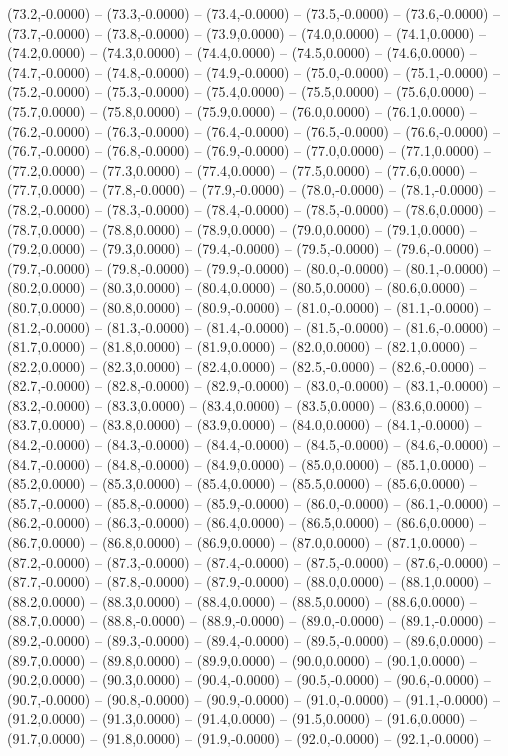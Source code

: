 \documentclass{SVnote}
\begin{document}
(73.2,-0.0000) -- (73.3,-0.0000) -- (73.4,-0.0000) -- (73.5,-0.0000) -- (73.6,-0.0000) -- (73.7,-0.0000) -- (73.8,-0.0000) -- (73.9,0.0000) -- (74.0,0.0000) -- (74.1,0.0000) -- (74.2,0.0000) -- (74.3,0.0000) -- (74.4,0.0000) -- (74.5,0.0000) -- (74.6,0.0000) -- (74.7,-0.0000) -- (74.8,-0.0000) -- (74.9,-0.0000) -- (75.0,-0.0000) -- (75.1,-0.0000) -- (75.2,-0.0000) -- (75.3,-0.0000) -- (75.4,0.0000) -- (75.5,0.0000) -- (75.6,0.0000) -- (75.7,0.0000) -- (75.8,0.0000) -- (75.9,0.0000) -- (76.0,0.0000) -- (76.1,0.0000) -- (76.2,-0.0000) -- (76.3,-0.0000) -- (76.4,-0.0000) -- (76.5,-0.0000) -- (76.6,-0.0000) -- (76.7,-0.0000) -- (76.8,-0.0000) -- (76.9,-0.0000) -- (77.0,0.0000) -- (77.1,0.0000) -- (77.2,0.0000) -- (77.3,0.0000) -- (77.4,0.0000) -- (77.5,0.0000) -- (77.6,0.0000) -- (77.7,0.0000) -- (77.8,-0.0000) -- (77.9,-0.0000) -- (78.0,-0.0000) -- (78.1,-0.0000) -- (78.2,-0.0000) -- (78.3,-0.0000) -- (78.4,-0.0000) -- (78.5,-0.0000) -- (78.6,0.0000) -- (78.7,0.0000) -- (78.8,0.0000) -- (78.9,0.0000) -- (79.0,0.0000) -- (79.1,0.0000) -- (79.2,0.0000) -- (79.3,0.0000) -- (79.4,-0.0000) -- (79.5,-0.0000) -- (79.6,-0.0000) -- (79.7,-0.0000) -- (79.8,-0.0000) -- (79.9,-0.0000) -- (80.0,-0.0000) -- (80.1,-0.0000) -- (80.2,0.0000) -- (80.3,0.0000) -- (80.4,0.0000) -- (80.5,0.0000) -- (80.6,0.0000) -- (80.7,0.0000) -- (80.8,0.0000) -- (80.9,-0.0000) -- (81.0,-0.0000) -- (81.1,-0.0000) -- (81.2,-0.0000) -- (81.3,-0.0000) -- (81.4,-0.0000) -- (81.5,-0.0000) -- (81.6,-0.0000) -- (81.7,0.0000) -- (81.8,0.0000) -- (81.9,0.0000) -- (82.0,0.0000) -- (82.1,0.0000) -- (82.2,0.0000) -- (82.3,0.0000) -- (82.4,0.0000) -- (82.5,-0.0000) -- (82.6,-0.0000) -- (82.7,-0.0000) -- (82.8,-0.0000) -- (82.9,-0.0000) -- (83.0,-0.0000) -- (83.1,-0.0000) -- (83.2,-0.0000) -- (83.3,0.0000) -- (83.4,0.0000) -- (83.5,0.0000) -- (83.6,0.0000) -- (83.7,0.0000) -- (83.8,0.0000) -- (83.9,0.0000) -- (84.0,0.0000) -- (84.1,-0.0000) -- (84.2,-0.0000) -- (84.3,-0.0000) -- (84.4,-0.0000) -- (84.5,-0.0000) -- (84.6,-0.0000) -- (84.7,-0.0000) -- (84.8,-0.0000) -- (84.9,0.0000) -- (85.0,0.0000) -- (85.1,0.0000) -- (85.2,0.0000) -- (85.3,0.0000) -- (85.4,0.0000) -- (85.5,0.0000) -- (85.6,0.0000) -- (85.7,-0.0000) -- (85.8,-0.0000) -- (85.9,-0.0000) -- (86.0,-0.0000) -- (86.1,-0.0000) -- (86.2,-0.0000) -- (86.3,-0.0000) -- (86.4,0.0000) -- (86.5,0.0000) -- (86.6,0.0000) -- (86.7,0.0000) -- (86.8,0.0000) -- (86.9,0.0000) -- (87.0,0.0000) -- (87.1,0.0000) -- (87.2,-0.0000) -- (87.3,-0.0000) -- (87.4,-0.0000) -- (87.5,-0.0000) -- (87.6,-0.0000) -- (87.7,-0.0000) -- (87.8,-0.0000) -- (87.9,-0.0000) -- (88.0,0.0000) -- (88.1,0.0000) -- (88.2,0.0000) -- (88.3,0.0000) -- (88.4,0.0000) -- (88.5,0.0000) -- (88.6,0.0000) -- (88.7,0.0000) -- (88.8,-0.0000) -- (88.9,-0.0000) -- (89.0,-0.0000) -- (89.1,-0.0000) -- (89.2,-0.0000) -- (89.3,-0.0000) -- (89.4,-0.0000) -- (89.5,-0.0000) -- (89.6,0.0000) -- (89.7,0.0000) -- (89.8,0.0000) -- (89.9,0.0000) -- (90.0,0.0000) -- (90.1,0.0000) -- (90.2,0.0000) -- (90.3,0.0000) -- (90.4,-0.0000) -- (90.5,-0.0000) -- (90.6,-0.0000) -- (90.7,-0.0000) -- (90.8,-0.0000) -- (90.9,-0.0000) -- (91.0,-0.0000) -- (91.1,-0.0000) -- (91.2,0.0000) -- (91.3,0.0000) -- (91.4,0.0000) -- (91.5,0.0000) -- (91.6,0.0000) -- (91.7,0.0000) -- (91.8,0.0000) -- (91.9,-0.0000) -- (92.0,-0.0000) -- (92.1,-0.0000) -- 
\end{document}
